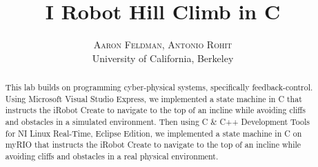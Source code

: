 \documentclass[twoside]{article}
\title{\vspace{-15mm}\fontsize{24pt}{10pt}\selectfont\textbf{I Robot Hill Climb in C}} %
\author{
\large
\textsc{Aaron Feldman, Antonio Rohit}\\[2mm] %
\normalsize University of California, Berkeley \\ %
\vspace{-5mm}
}
\date{}
\begin{document}
\maketitle %

\thispagestyle{fancy} %


\begin{abstract}

\noindent This lab builds on programming cyber-physical systems, specifically feedback-control. Using Microsoft Visual Studio Express, we implemented a state machine in C that instructs the iRobot Create to navigate to the top of an incline while avoiding cliffs and obstacles in a simulated environment. Then using C \& C++ Development Tools for NI Linux Real-Time, Eclipse Edition, we implemented a state machine in C on myRIO that instructs the iRobot Create to navigate to the top of an incline while avoiding cliffs and obstacles in a real physical environment.

\end{abstract}

\end{document}
